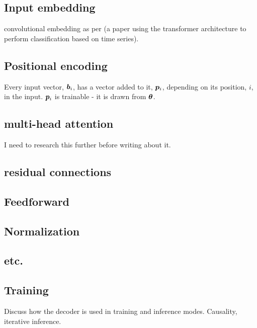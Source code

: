 \subsection{Input embedding}
convolutional embedding as per \citep{Song2017} (a paper using the transformer architecture to perform classification based on time series).

\subsection{Positional encoding}
Every input vector, ${\bm{b}}_i$, has a vector added to it, ${\bm{p}}_i$, depending on its position, $i$, in the input.
${\bm{p}}_i$ is trainable - it is drawn from ${\bm{\theta}}$.

\subsection{multi-head attention}
I need to research this further before writing about it.

\subsection{residual connections}

\subsection{Feedforward}

\subsection{Normalization}

\subsection{etc.}

\subsection{Training}
Discuss how the decoder is used in training and inference modes.
Causality, iterative inference.
	